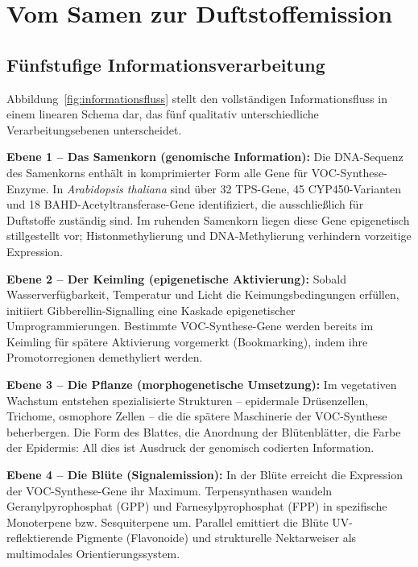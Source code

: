 \documentclass[12pt,a4paper]{article}
\begin{document}
\section{Vom Samen zur Duftstoffemission}

\subsection{F\"unfstufige Informationsverarbeitung}

Abbildung~\ref{fig:informationsfluss} stellt den vollst\"andigen Informationsfluss in einem linearen Schema dar, das f\"unf qualitativ unterschiedliche Verarbeitungsebenen unterscheidet.

\textbf{Ebene 1 -- Das Samenkorn (genomische Information):} Die DNA-Sequenz des Samenkorns enth\"alt in komprimierter Form alle Gene f\"ur VOC-Synthese-Enzyme. In \textit{Arabidopsis thaliana} sind \"uber 32 TPS-Gene, 45 CYP450-Varianten und 18 BAHD-Acetyltransferase-Gene identifiziert, die ausschlie{\ss}lich f\"ur Duftstoffe zust\"andig sind. Im ruhenden Samenkorn liegen diese Gene epigenetisch stillgestellt vor; Histonmethylierung und DNA-Methylierung verhindern vorzeitige Expression.

\textbf{Ebene 2 -- Der Keimling (epigenetische Aktivierung):} Sobald Wasserverf\"ugbarkeit, Temperatur und Licht die Keimungsbedingungen erf\"ullen, initiiert Gibberellin-Signalling eine Kaskade epigenetischer Umprogrammierungen. Bestimmte VOC-Synthese-Gene werden bereits im Keimling f\"ur sp\"atere Aktivierung vorgemerkt (Bookmarking), indem ihre Promotorregionen demethyliert werden.

\textbf{Ebene 3 -- Die Pflanze (morphogenetische Umsetzung):} Im vegetativen Wachstum entstehen spezialisierte Strukturen -- epidermale Dr\"usenzellen, Trichome, osmophore Zellen -- die die sp\"atere Maschinerie der VOC-Synthese beherbergen. Die Form des Blattes, die Anordnung der Bl\"utenbl\"atter, die Farbe der Epidermis: All dies ist Ausdruck der genomisch codierten Information.

\textbf{Ebene 4 -- Die Bl\"ute (Signalemission):} In der Bl\"ute erreicht die Expression der VOC-Synthese-Gene ihr Maximum. Terpensynthasen wandeln Geranylpyrophosphat (GPP) und Farnesylpyrophosphat (FPP) in spezifische Monoterpene bzw. Sesquiterpene um. Parallel emittiert die Bl\"ute UV-reflektierende Pigmente (Flavonoide) und strukturelle Nektarweiser als multimodales Orientierungssystem.
\end{document}

